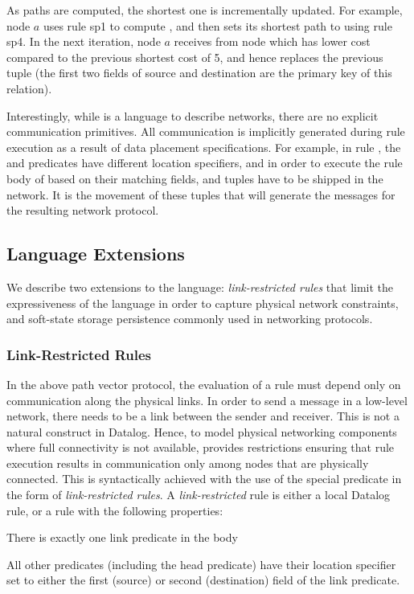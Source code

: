 
As paths are computed, the shortest one is incrementally
updated. For example, node $a$ uses rule sp1 to compute
, and then sets its shortest path to
 using rule sp4. In the next iteration,
node $a$ receives  from node  which has
lower cost compared to the previous shortest cost of 5, and hence
 replaces the previous tuple (the first
two fields of source and destination are the primary key of this relation).

Interestingly, while \Dlog is a language to describe networks, there
are no explicit communication primitives. All communication is
implicitly generated during rule execution as a result of data
placement specifications. For example, in rule , the  and 
predicates have different location specifiers, and in order to execute
the rule body of  based on their matching fields, 
and  tuples have to be shipped in the network. It is the
movement of these tuples that will generate the messages for the
resulting network protocol.  


\subsection{Language Extensions}

We describe two extensions to the \Dlog language: {\em
  link-restricted rules} that limit the expressiveness of the
language in order to capture physical network constraints, and  
soft-state storage persistence commonly used in networking
protocols.

\subsubsection{Link-Restricted Rules}

In the above path vector protocol, the evaluation of a rule must
depend only on communication along the physical links.  In order to
send a message in a low-level network, there needs to be a link
between the sender and receiver. This is not a natural construct in
Datalog. Hence, to model physical networking components where
full connectivity is not available, \Dlog provides
restrictions ensuring that rule execution results in
communication only among nodes that are physically connected. This is
syntactically achieved with the use of the special  predicate
in the form of {\em link-restricted rules}. A {\em link-restricted}
rule is either a local Datalog rule, or a rule with the following
properties:
\begin{myenumerate}
\item There is exactly one link predicate in the body
\item All other predicates (including the
      head predicate) have their
  location specifier set to either the first (source) or second
  (destination) field of the link predicate. 
\end{myenumerate}

